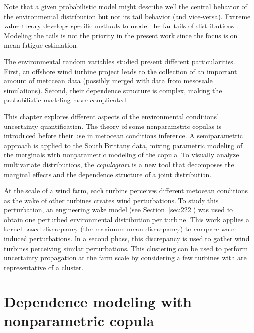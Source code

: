 Note that a given probabilistic model might describe well the central behavior of the environmental distribution but not its tail behavior (and vice-versa).   
Extreme value theory develops specific methods to model the far tails of distributions \citep{beirlant_2006_extreme_values}. 
Modeling the tails is not the priority in the present work since the focus is on mean fatigue estimation.   

The environmental random variables studied present different particularities. 
First, an offshore wind turbine project leads to the collection of an important amount of metocean data (possibly merged with data from mesoscale simulations). 
Second, their dependence structure is complex, making the probabilistic modeling more complicated. 

This chapter explores different aspects of the environmental conditions' uncertainty quantification. 
The theory of some nonparametric copulas is introduced before their use in metocean conditions inference. 
A semiparametric approach is applied to the South Brittany data, mixing parametric modeling of the marginals with nonparametric modeling of the copula. 
To visually analyze multivariate distributions, the \textit{copulogram} is a new tool that decomposes the marginal effects and the dependence structure of a joint distribution. 

At the scale of a wind farm, each turbine perceives different metocean conditions as the wake of other turbines creates wind perturbations. 
To study this perturbation, an engineering wake model (see Section~\ref{sec:222}) was used to obtain one perturbed environmental distribution per turbine. 
This work applies a kernel-based discrepancy (the maximum mean discrepancy) to compare wake-induced perturbations. 
In a second phase, this discrepancy is used to gather wind turbines perceiving similar perturbations. 
This clustering can be used to perform uncertainty propagation at the farm scale by considering a few turbines with are representative of a cluster. 


\section{Dependence modeling with nonparametric copula}\label{sec:nonparametric_copula}

